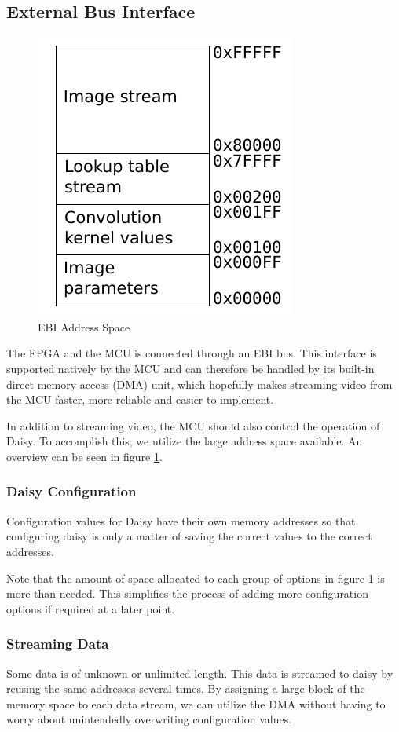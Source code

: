 \subsection{External Bus Interface}
\begin{figure}
    \centering
    \includegraphics[]{img/EbiAddressSpace.pdf}
    \caption{EBI Address Space}
    \label{fig:EbiAddressSpace}
\end{figure}
The FPGA and the MCU is connected through an EBI bus.
This interface is supported natively by the MCU and can therefore be handled by its built-in direct memory access (DMA) unit, which hopefully makes streaming video from the MCU faster, more reliable and easier to implement.

In addition to streaming video, the MCU should also control the operation of Daisy.
To accomplish this, we utilize the large address space available.
An overview can be seen in figure \ref{fig:EbiAddressSpace}.

\subsubsection{Daisy Configuration}
Configuration values for Daisy have their own memory addresses so that configuring daisy is only a matter of saving the correct values to the correct addresses.

Note that the amount of space allocated to each group of options in figure \ref{fig:EbiAddressSpace} is more than needed.
This simplifies the process of adding more configuration options if required at a later point.

\subsubsection{Streaming Data}
Some data is of unknown or unlimited length. This data is streamed to daisy by reusing the same addresses several times.
By assigning a large block of the memory space to each data stream, we can utilize the DMA without having to worry about unintendedly overwriting configuration values.

